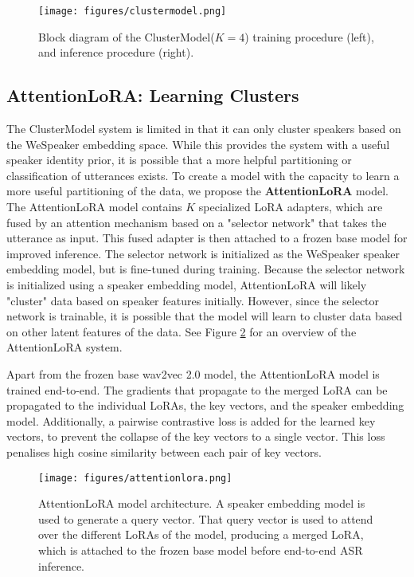 \begin{figure}[h]
      \centering
      \texttt{[image: figures/clustermodel.png]}
      \caption{Block diagram of the ClusterModel($K=4$) training procedure (left), and inference procedure (right).}
      \label{fig:clustermodel}
\end{figure}

\subsection{AttentionLoRA: Learning Clusters}

The ClusterModel system is limited in that it can only cluster speakers based on the WeSpeaker embedding space.
While this provides the system with a useful speaker identity prior, it is possible that a more helpful partitioning or classification of utterances exists.
To create a model with the capacity to learn a more useful partitioning of the data, we propose the \textbf{AttentionLoRA} model.
The AttentionLoRA model contains $K$ specialized LoRA adapters, which are fused by an attention mechanism based on a "selector network" that takes the utterance as input.
This fused adapter is then attached to a frozen base model for improved inference.
The selector network is initialized as the WeSpeaker speaker embedding model, but is fine-tuned during training.
Because the selector network is initialized using a speaker embedding model, AttentionLoRA will likely "cluster" data based on speaker features initially.
However, since the selector network is trainable, it is possible that the model will learn to cluster data based on other latent features of the data.
See Figure \ref{fig:attentionlora} for an overview of the AttentionLoRA system.


Apart from the frozen base wav2vec 2.0 model, the AttentionLoRA model is trained end-to-end.
The gradients that propagate to the merged LoRA can be propagated to the individual LoRAs, the key vectors, and the speaker embedding model.
Additionally, a pairwise contrastive loss is added for the learned key vectors, to prevent the collapse of the key vectors to a single vector.
This loss penalises high cosine similarity between each pair of key vectors.


\begin{figure}
      \centering
      \texttt{[image: figures/attentionlora.png]}
      \caption{AttentionLoRA model architecture. A speaker embedding model is used to generate a query vector.
      That query vector is used to attend over the different LoRAs of the model, producing a merged LoRA, which is attached to the frozen base model before end-to-end ASR inference.}
      \label{fig:attentionlora}
\end{figure}

